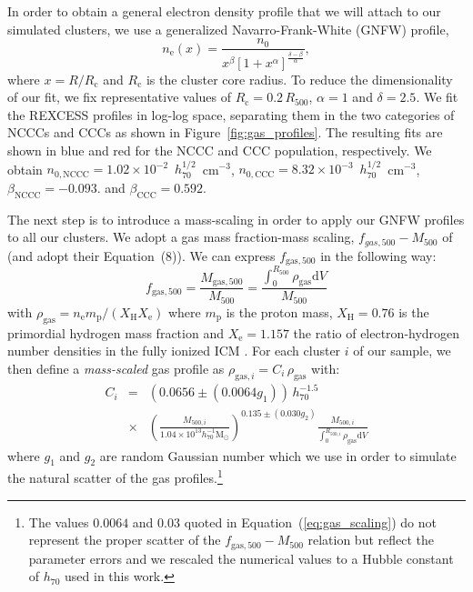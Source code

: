 \documentclass[traditabstract]{aa}
\newcommand{\rmn}{\mathrm}
\begin{document}
In order to obtain a general electron density profile that we will attach to our
simulated clusters, we use a generalized Navarro-Frank-White (GNFW) profile,
\begin{equation}
n_{\rmn{e}}(x) = \frac{n_{0}}{x^{\beta}\left[1+x^{\alpha}\right]^{\frac{\delta-\beta}{\alpha}}},
\label{eq:gnfw}
\end{equation}
where $x=R/R_{\rmn{c}}$ and $R_{\rmn{c}}$ is the cluster core radius. To reduce
the dimensionality of our fit, we fix representative values of $R_{\rmn{c}} =
0.2\, R_{500}$, $\alpha = 1$ and $\delta = 2.5$. We fit the REXCESS profiles in
log-log space, separating them in the two categories of NCCCs and CCCs as shown
in Figure~\ref{fig:gas_profiles}. The resulting fits are shown in blue and red
for the NCCC and CCC population, respectively. We obtain $n_{\rmn{0,NCCC}} =
1.02\times10^{-2}$~$h_{70}^{1/2}$~cm$^{-3}$, $n_{\rmn{0,CCC}} =
8.32\times10^{-3}$~$h_{70}^{1/2}$~cm$^{-3}$, $\beta_{\rmn{NCCC}} = -0.093$. and
$\beta_{\rmn{CCC}} = 0.592$.

The next step is to introduce a mass-scaling in order to apply our GNFW profiles
to all our clusters. We adopt a gas mass fraction-mass scaling,
$f_{gas,500}-M_{500}$ of \cite{2009ApJ...693.1142S} (and adopt their Equation~(8)). We can
express $f_{\rmn{gas},500}$ in the following way:
\begin{equation}
f_{\rmn{gas},500} = \frac{M_{\rmn{gas},500}}{M_{500}}  = \frac{\int_{0}^{R_{500}} \rho_{\rmn{gas}} \rmn{d}V}{M_{500}}
\label{eq:m500}
\end{equation}
with $\rho_{\rmn{gas}} = n_{\rmn{e}} m_{\rmn{p}} / ( X_{\rmn{H}}X_{\rmn{e}} )$ where
$m_{\rmn{p}}$ is the proton mass, $X_{\rmn{H}} = 0.76$ is the primordial hydrogen
mass fraction and $X_{\rmn{e}} = 1.157$ the ratio of electron-hydrogen number
densities in the fully ionized ICM \citep{1988xrec.book.....S}. For each cluster
$i$ of our sample, we then define a \emph{mass-scaled} gas profile as
$\rho_{\rmn{gas},i}=C_{i} \,\rho_{\rmn{gas}}$ with:
\begin{eqnarray}
C_{i}  & = &  (0.0656\pm(0.0064g_{1})) \, h_{70}^{-1.5}  \nonumber \\
 & \times & \left(\frac{M_{500,i}}{1.04 \times 10^{13} h_{70}^{-1} \rmn{M_{\odot}}}\right)^{0.135\pm(0.030g_{2})} \frac{M_{500,i}}{\int_{0}^{R_{500,i}} \rho_{\rmn{gas}} \rmn{d}V}
\label{eq:gas_scaling}
\end{eqnarray}
where $g_{1}$ and $g_{2}$ are random Gaussian number which we use in order to
simulate the natural scatter of the gas profiles.\footnote{The values
  $0.0064$ and $0.03$ quoted in Equation~(\ref{eq:gas_scaling}) do not represent
  the proper scatter of the $f_{\rmn{gas},500}-M_{500}$ relation but reflect the
  parameter errors and we rescaled the numerical values to a Hubble constant of
  $h_{70}$ used in this work.}
\end{document}
